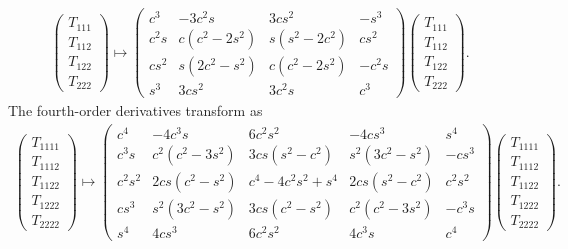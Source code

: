 \documentclass[a4paper, 11pt]{article}
\begin{document}
\begin{align}
\begin{pmatrix} T_{111} \\ T_{112} \\ T_{122}\\ T_{222} \end{pmatrix}
\mapsto
\begin{pmatrix}
c^3   & -3 c^2 s        & 3 c s^2          & -s^3   \\
c^2 s &  c(c^2 - 2 s^2) & s( s^2- 2 c^2)   &  c s^2 \\
c s^2 &  s(2 c^2 - s^2) & c(c^2 -  2 s^2)  & -c^2 s \\
s^3   &  3 c s^2        & 3 c^2 s          & c^3 
\end{pmatrix}
\begin{pmatrix} T_{111} \\ T_{112} \\ T_{122}\\ T_{222} \end{pmatrix}.
\end{align}
The fourth-order derivatives transform as
\begin{align}
\begin{pmatrix} T_{1111} \\ T_{1112} \\ T_{1122}\\ T_{1222} \\ T_{2222} \end{pmatrix}
\mapsto
\begin{pmatrix}
c^4     & -4 c^3 s          & 6 c^2 s^2               &- 4 c s^3          &  s^4     \\
c^3 s   & c^2(c^2 - 3 s^2)  & 3cs(s^2 - c^2)     & s^2(3 c^2  - s^2) & -c s^3   \\
c^2 s^2 & 2cs( c^2 -  s^2)  & c^4  - 4 c^2 s^2  + s^4 & 2cs(  s^2 -  c^2) &  c^2 s^2 \\
c s^3   & s^2(3 c^2  - s^2) & 3cs( c^2 - s^2 )   & c^2(c^2  - 3 s^2) & -c^3 s   \\
s^4     & 4cs^3             & 6 c^2 s^2               & 4 c^3 s           &  c^4 
\end{pmatrix}
\begin{pmatrix} T_{1111} \\ T_{1112} \\ T_{1122}\\ T_{1222} \\ T_{2222} \end{pmatrix}.
\end{align}
\end{document}
